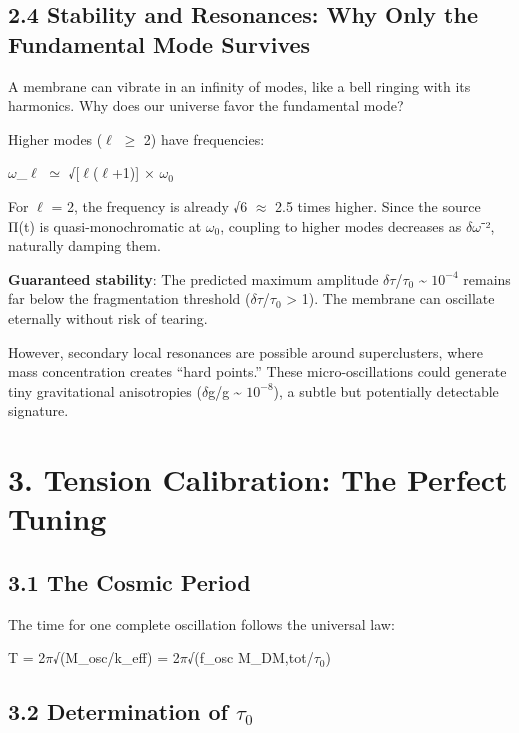\documentclass[
  11pt,
]{report}
\begin{document}
\subsection{2.4 Stability and Resonances: Why Only the Fundamental Mode
Survives}\label{stability-and-resonances-why-only-the-fundamental-mode-survives}

A membrane can vibrate in an infinity of modes, like a bell ringing with
its harmonics. Why does our universe favor the fundamental mode?

Higher modes (\(\ell\) \(\geq\) 2) have frequencies:

\(\omega\)\_\(\ell\) \(\simeq\) √{[}\(\ell\)(\(\ell\)+1){]} ×
\(\omega_0\)

For \(\ell\) = 2, the frequency is already √6 \(\approx\) 2.5 times
higher. Since the source Π(t) is quasi-monochromatic at \(\omega_0\),
coupling to higher modes decreases as \(\delta\omega\)⁻², naturally
damping them.

\textbf{Guaranteed stability}: The predicted maximum amplitude
\(\delta\tau\)/\(\tau_0\) \textasciitilde{} \(10^{-4}\) remains far
below the fragmentation threshold (\(\delta\tau\)/\(\tau_0\)
\textgreater{} 1). The membrane can oscillate eternally without risk of
tearing.

However, secondary local resonances are possible around superclusters,
where mass concentration creates ``hard points.'' These
micro-oscillations could generate tiny gravitational anisotropies
(\(\delta\)g/g \textasciitilde{} \(10^{-8}\)), a subtle but potentially
detectable signature.

\section{3. Tension Calibration: The Perfect
Tuning}\label{tension-calibration-the-perfect-tuning}

\subsection{3.1 The Cosmic Period}\label{the-cosmic-period}

The time for one complete oscillation follows the universal law:

T = 2\(\pi\)√(M\_osc/k\_eff) = 2\(\pi\)√(f\_osc M\_DM,tot/\(\tau_0\))

\subsection{\texorpdfstring{3.2 Determination of
\(\tau_0\)}{3.2 Determination of \textbackslash tau\_0}}\label{determination-of-tau_0}
\end{document}

